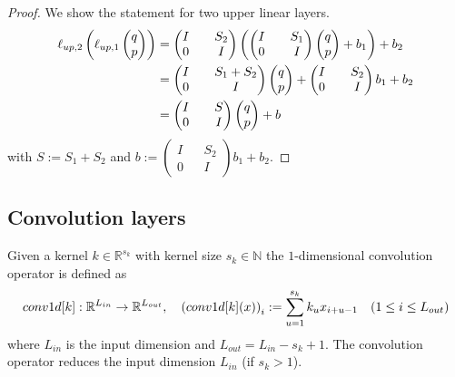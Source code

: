 \documentclass[twoside,a4paper]{article}
\begin{document}
\begin{proof}
	We show the statement for two upper linear layers.
	\begin{align*}
		\ell_{up,2}\left(\ell_{up,1} \begin{pmatrix} q \\ p \end{pmatrix}\right) &=
		\begin{pmatrix}
			I && S_2 \\
			0 && I
		\end{pmatrix}
		\left(
		\begin{pmatrix}
			I && S_1 \\
			0 && I
		\end{pmatrix}
		\begin{pmatrix} q \\ p \end{pmatrix} + b_1
		\right) + b_2 \\
		&= \begin{pmatrix}
			I && S_1 + S_2 \\
			0 && I
		\end{pmatrix} \begin{pmatrix} q \\ p \end{pmatrix}
		+ \begin{pmatrix}
			I && S_2 \\
			0 && I
		\end{pmatrix} b_1
		+ b_2 \\
		&= \begin{pmatrix}
			I && S \\
			0 && I
		\end{pmatrix} \begin{pmatrix} q \\ p \end{pmatrix} + b
	\end{align*}
	with $S := S_1 + S_2$ and $b := \begin{pmatrix}
		I && S_2 \\
		0 && I
	\end{pmatrix} b_1
	+ b_2$.
\end{proof}

\subsection{Convolution layers}


Given a kernel $k \in \mathbb{R}^{s_k}$ with kernel size $s_k \in \mathbb{N}$
the $1$-dimensional convolution operator is defined as
\begin{equation*}
	conv1d[k]: \mathbb{R}^{L_{in}} \to \mathbb{R}^{L_{out}}, \quad
	\left( conv1d[k](x) \right)_i := \sum_{u=1}^{s_k} k_u x_{i+u-1} \quad
	(1 \leq i \leq L_{out})
\end{equation*}
where $L_{in}$ is the input dimension and $L_{out} = L_{in} - s_k + 1$.
The convolution operator reduces the input dimension $L_{in}$ (if $s_k > 1$).
\end{document}

